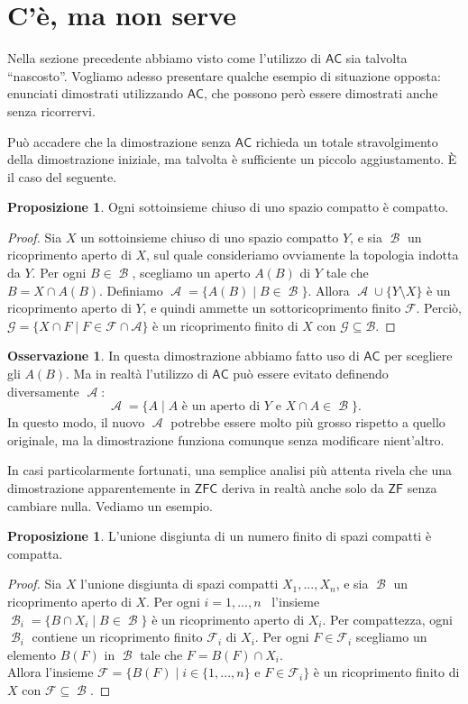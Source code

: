 \documentclass[12pt,a4paper]{report}
\theoremstyle{definition}
\newtheorem{oss}[teo]{Osservazione}  %
\newtheorem{prop}[teo]{Proposizione}  %
\theoremstyle{num.custom-title}
\DeclareMathOperator{\A}{\mathcal{A}}
\DeclareMathOperator{\B}{\mathcal{B}}
\DeclareMathOperator{\sm}{\setminus}
\newcommand{\AC}{\ensuremath{\mathsf{AC}}\xspace}
\newcommand{\ZF}{\ensuremath{\mathsf{ZF}}\xspace}
\newcommand{\ZFC}{\ensuremath{\mathsf{ZFC}}\xspace}
\begin{document}
\section{C'è, ma non serve}

Nella sezione precedente abbiamo visto come l'utilizzo di \AC sia talvolta ``nascosto''. Vogliamo adesso presentare qualche esempio di situazione opposta: enunciati dimostrati utilizzando \AC, che possono però essere dimostrati anche senza ricorrervi.

Può accadere che la dimostrazione senza \AC richieda un totale stravolgimento della dimostrazione iniziale, ma talvolta è sufficiente un piccolo aggiustamento. È il caso del seguente.

\begin{prop}
Ogni sottoinsieme chiuso di uno spazio compatto è compatto.
\begin{proof} Sia $X$ un sottoinsieme chiuso di uno spazio compatto $Y$, e sia $\B$ un ricoprimento aperto di $X$, sul quale consideriamo ovviamente la topologia indotta da $Y$. Per ogni $B \in \B$, scegliamo un aperto $A(B)$ di $Y$ tale che $B=X \cap A(B)$. Definiamo $\A=\{A(B) \mid B \in \B\}$. Allora $\A \cup \{Y \sm X\}$ è un ricoprimento aperto di $Y$, e quindi ammette un sottoricoprimento finito $\mathcal{F}$. Perciò, $\mathcal{G}=\{X \cap F \mid F \in \mathcal{F} \cap \mathcal{A}\}$ è un ricoprimento finito di $X$ con $\mathcal{G} \subseteq \mathcal{B}$.
\end{proof}
\end{prop}

\begin{oss}
In questa dimostrazione abbiamo fatto uso di \AC per scegliere gli $A(B)$. Ma in realtà l'utilizzo di \AC può essere evitato definendo diversamente $\A$:
\[
\A = \{A \mid A \text{ è un aperto di $Y$ e } X \cap A \in \B \}.
\]
In questo modo, il nuovo $\A$ potrebbe essere molto più grosso rispetto a quello originale, ma la dimostrazione funziona comunque senza modificare nient'altro.
\end{oss}

In casi particolarmente fortunati, una semplice analisi più attenta rivela che una dimostrazione apparentemente in \ZFC deriva in realtà anche solo da \ZF senza cambiare nulla. Vediamo un esempio.

\begin{prop}
L'unione disgiunta di un numero finito di spazi compatti è compatta.
\begin{proof}
Sia $X$ l'unione disgiunta di spazi compatti $X_1,...,X_n$, e sia $\B$ un ricoprimento aperto di $X$. Per ogni $i=1,...,n$ \ l'insieme $\B_i=\{B \cap X_i \mid B \in \B \}$ è un ricoprimento aperto di $X_i$. Per compattezza, ogni $\B_i$ contiene un ricoprimento finito $\mathcal{F}_i$ di $X_i$. Per ogni $F \in \mathcal{F}_i$ scegliamo un elemento $B(F)$ in $\B$ tale che $F=B(F) \cap X_i$.\\
Allora l'insieme $\mathcal{F}=\{B(F) \mid i \in \{1,...,n\} \text{ e } F \in \mathcal{F}_i\}$ è un ricoprimento finito di $X$ con $\mathcal{F} \subseteq \B$.
\end{proof}
\end{prop}
\end{document}
